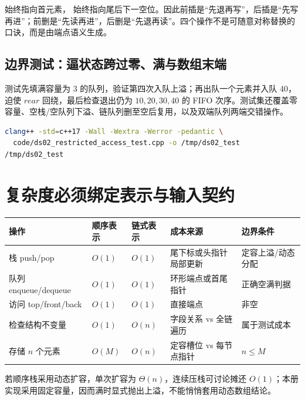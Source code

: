 \documentclass[UTF8,fontset=none,11pt,a4paper]{ctexart}
\begin{document}
 始终指向首元素， 始终指向尾后下一空位。因此前插是“先退再写”，后插是“先写再进”；前删是“先读再进”，后删是“先退再读”。四个操作不是可随意对称替换的口诀，而是由端点语义生成。

\subsection{边界测试：逼状态跨过零、满与数组末端}


测试先填满容量为 3 的队列，验证第四次入队上溢；再出队一个元素并入队 40，迫使 $rear$ 回绕，最后检查退出仍为 $10,20,30,40$ 的 FIFO 次序。测试集还覆盖零容量、空栈/空队列下溢、链队列删至空后复用，以及双端队列两端交错操作。

\begin{lstlisting}[language=bash]
clang++ -std=c++17 -Wall -Wextra -Werror -pedantic \
  code/ds02_restricted_access_test.cpp -o /tmp/ds02_test
/tmp/ds02_test
\end{lstlisting}

\section{复杂度必须绑定表示与输入契约}
\begin{center}\small
\begin{tabularx}{\linewidth}{L{2.4cm}C{1.8cm}C{1.8cm}YY}
\toprule
操作 & 顺序表示 & 链式表示 & 成本来源 & 边界条件\\
\midrule
栈 push/pop & $O(1)$ & $O(1)$ & 尾下标或头指针局部更新 & 定容上溢/动态分配\\
队列 enqueue/dequeue & $O(1)$ & $O(1)$ & 环形端点或首尾指针 & 正确空满判据\\
访问 top/front/back & $O(1)$ & $O(1)$ & 直接端点 & 非空\\
检查结构不变量 & $O(1)$ & $O(n)$ & 字段关系 vs 全链遍历 & 属于测试成本\\
存储 $n$ 个元素 & $O(M)$ & $O(n)$ & 定容槽位 vs 每节点指针 & $n\le M$\\
\bottomrule
\end{tabularx}
\end{center}
若顺序栈采用动态扩容，单次扩容为 $\Theta(n)$，连续压栈可讨论摊还 $O(1)$；本册实现采用固定容量，因而满时显式抛出上溢，不能悄悄套用动态数组结论。
\end{document}
